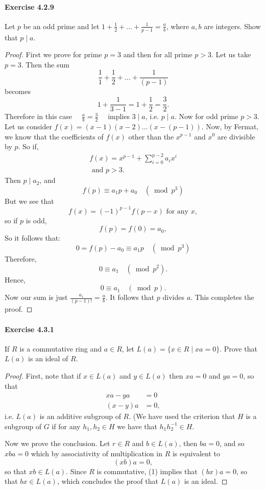 \documentclass{article}
\begin{document}
\paragraph{Exercise 4.2.9} Let $p$ be an odd prime and let $1 + \frac{1}{2} + ... + \frac{1}{p - 1} = \frac{a}{b}$, where $a, b$ are integers. Show that $p \mid a$.
\begin{proof}
    First we prove for prime $p=3$ and then for all prime $p>3$.
Let us take $p=3$. Then the sum
$$
\frac{1}{1}+\frac{1}{2}+\ldots+\frac{1}{(p-1)}
$$
becomes
$$
1+\frac{1}{3-1}=1+\frac{1}{2}=\frac{3}{2} .
$$
Therefore in this case $\quad \frac{a}{b}=\frac{3}{2} \quad$ implies $3 \mid a$, i.e. $p \mid a$.
Now for odd prime $p>3$.
Let us consider $f(x)=(x-1)(x-2) \ldots(x-(p-1))$.
Now, by Fermat, we know that the coefficients of $f(x)$ other than the $x^{p-1}$ and $x^0$ are divisible by $p$.
So if,
$$
\begin{array}{r}
f(x)=x^{p-1}+\sum_{i=0}^{p-2} a_i x^i \\
\text { and } p>3 .
\end{array}
$$
Then $p \mid a_2$, and
$$
f(p) \equiv a_1 p+a_0 \quad\left(\bmod p^3\right)
$$
But we see that
$$
f(x)=(-1)^{p-1} f(p-x) \text { for any } x,
$$
so if $p$ is odd,
$$
f(p)=f(0)=a_0,
$$
So it follows that:
$$
0=f(p)-a_0 \equiv a_1 p \quad\left(\bmod p^3\right)
$$
Therefore,
$$
0 \equiv a_1 \quad\left(\bmod p^2\right) .
$$
Hence,
$$
0 \equiv a_1 \quad(\bmod p) .
$$
Now our sum is just $\frac{a_1}{(p-1) !}=\frac{a}{b}$.
It follows that $p$ divides $a$. This completes the proof.
\end{proof}



\paragraph{Exercise 4.3.1} If $R$ is a commutative ring and $a \in R$, let $L(a) = \{x \in R \mid xa = 0\}$. Prove that $L(a)$ is an ideal of $R$.
\begin{proof}
    First, note that if $x \in L(a)$ and $y \in L(a)$ then $x a=0$ and $y a=0$, so that
$$
\begin{aligned}
x a-y a & =0 \\
(x-y) a & =0,
\end{aligned}
$$
i.e. $L(a)$ is an additive subgroup of $R$. (We have used the criterion that $H$ is a subgroup of $G$ if for any $h_1, h_2 \in H$ we have that $h_1 h_2^{-1} \in H$. 

Now we prove the conclusion. Let $r \in R$ and $b \in L(a)$, then $b a=0$, and so $x b a=0$ which by associativity of multiplication in $R$ is equivalent to
$$
(x b) a=0,
$$
so that $x b \in L(a)$. Since $R$ is commutative, (1) implies that $(bx)a=0$, so that $b x \in L(a)$, which concludes the proof that $L(a)$ is an ideal.
\end{proof}
\end{document}
